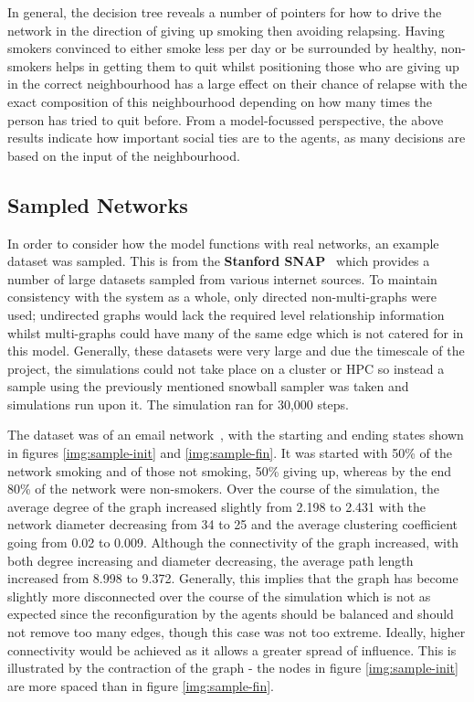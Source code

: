 \documentclass[]{report}
\begin{document}
In general, the decision tree reveals a number of pointers for how to drive the network in the direction of giving up smoking then avoiding relapsing. Having smokers convinced to either smoke less per day or be surrounded by healthy, non-smokers helps in getting them to quit whilst positioning those who are giving up in the correct neighbourhood has a large effect on their chance of relapse with the exact composition of this neighbourhood depending on how many times the person has tried to quit before. From a model-focussed perspective, the above results indicate how important social ties are to the agents, as many decisions are based on the input of the neighbourhood.

\subsection{Sampled Networks}
In order to consider how the model functions with real networks, an example dataset was sampled. This is from the \textbf{Stanford SNAP}~\cite{SNAP} which provides a number of large datasets sampled from various internet sources. To maintain consistency with the system as a whole, only directed non-multi-graphs were used; undirected graphs would lack the required level relationship information whilst multi-graphs could have many of the same edge which is not catered for in this model. Generally, these datasets were very large and due the timescale of the project, the simulations could not take place on a cluster or HPC so instead a sample using the previously mentioned snowball sampler was taken and simulations run upon it. The simulation ran for 30,000 steps.

The dataset was of an email network~\cite{SNAP-email}, with the starting and ending states shown in figures \ref{img:sample-init} and \ref{img:sample-fin}. It was started with 50\% of the network smoking and of those not smoking, 50\% giving up, whereas by the end 80\% of the network were non-smokers. Over the course of the simulation, the average degree of the graph increased slightly from 2.198 to 2.431 with the network diameter decreasing from 34 to 25 and the average clustering coefficient going from 0.02 to 0.009. Although the connectivity of the graph increased, with both degree increasing and diameter decreasing, the average path length increased from 8.998 to 9.372. Generally, this implies that the graph has become slightly more disconnected over the course of the simulation which is not as expected since the reconfiguration by the agents should be balanced and should not remove too many edges, though this case was not too extreme. Ideally, higher connectivity would be achieved as it allows a greater spread of influence. This is illustrated by the contraction of the graph - the nodes in figure \ref{img:sample-init} are more spaced than in figure \ref{img:sample-fin}.
\end{document}
